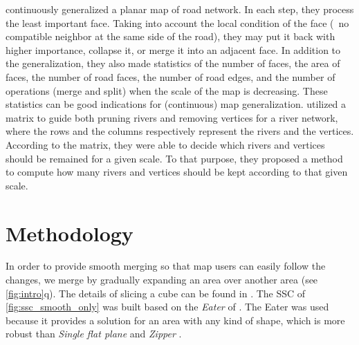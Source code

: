 \documentclass[ijgi,article,submit,moreauthors,pdftex]{Definitions/mdpi}
\begin{document}
\citet{Suba2016Road} continuously generalized a planar map of road network.
In each step, they process the least important face.
Taking into account the local condition of the face
(\eg~no compatible neighbor at the same side of the road),
they may put it back with higher importance, collapse it, 
or merge it into an adjacent face.
In addition to the generalization, 
they also made statistics of the number of faces,
the area of faces, the number of road faces, the number of road edges,
and the number of operations (merge and split) 
when the scale of the map is decreasing.
These statistics can be good indications 
for (continuous) map generalization.
\citet{Huang2017Matrix} utilized a matrix to guide 
both pruning rivers and removing vertices for a river network, 
where the rows and the columns respectively represent
the rivers and the vertices.
According to the matrix, 
they were able to decide which rivers and vertices 
should be remained for a given scale.
To that purpose, they proposed a method 
to compute how many rivers and vertices 
should be kept according to that given scale.






%

\section{Methodology}
\label{sec:methodology}



In order to provide smooth merging
so that map users can easily follow the changes,
we merge by gradually expanding an area over another area
(see \fig\ref{fig:intro}q).
The details of slicing a cube can be found in \citet{Meijers2020Web}.
The SSC of \fig\ref{fig:ssc_smooth_only} was built 
based on the \emph{Eater} of \citet{Suba2014Merge}.
The Eater was used because it provides a solution 
for an area with any kind of shape, which is more robust than
\emph{Single flat plane} and \emph{Zipper} \citep{Suba2014Merge}.
\end{document}
